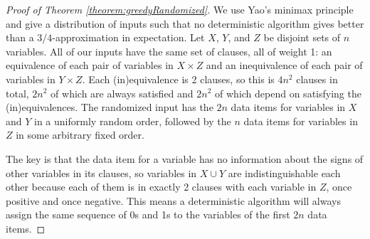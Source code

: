 \documentclass[11pt,letter]{article}
\numberwithin{theorem}{section}
\begin{document}
\begin{proof}[Proof of Theorem \ref{theorem:greedyRandomized}]
  We use Yao's minimax principle \cite{Yao}
  and give a distribution of inputs
  such that no deterministic algorithm gives better than a $3/4$-approximation
  in expectation.
  Let $X$, $Y$, and $Z$ be disjoint sets of $n$ variables.
  All of our inputs have the same set of clauses, all of weight 1:
  an equivalence of each pair of variables in $X \times Z$
  and an inequivalence of each pair of variables in $Y \times Z$.
  Each (in)equivalence is 2 clauses, so this is $4n^2$ clauses in total,
  $2n^2$ of which are always satisfied
  and $2n^2$ of which depend on satisfying the (in)equivalences.
  The randomized input has the $2n$ data items for variables in $X$ and $Y$
  in a uniformly random order,
  followed by the $n$ data items for variables in $Z$
  in some arbitrary fixed order.

  The key is that the data item for a variable has no information about
  the signs of other variables in its clauses,
  so variables in $X \cup Y$ are indistinguishable each other
  because each of them is in exactly 2 clauses with each variable in $Z$,
  once positive and once negative.
  This means a deterministic algorithm will always assign
  the same sequence of 0s and 1s
  to the variables of the first $2n$ data items.
\end{proof}



\end{document}

